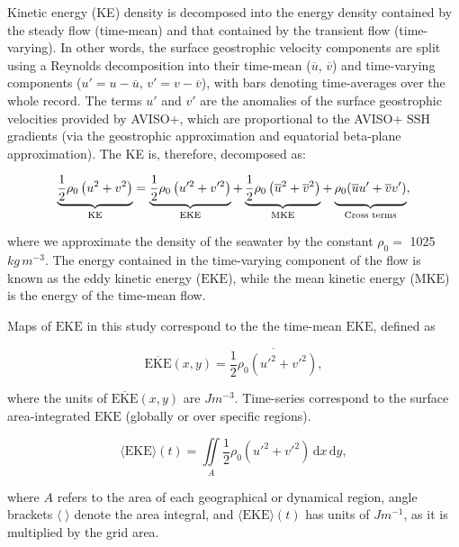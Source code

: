 \documentclass{nature}
\newcommand{\KE}{\text{KE}}
\newcommand{\MKE}{\text{MKE}}
\newcommand{\EKE}{\text{EKE}}
\newcommand{\SSH}{\text{SSH}}
\begin{document}
Kinetic energy (KE) density is decomposed into the energy density contained by the steady flow (time-mean) and that contained by the transient flow (time-varying). In other words, the surface geostrophic velocity components are split using a Reynolds decomposition into their time-mean ($\overline{u}$, $\overline{v}$) and time-varying components ($u'=u-\overline{u}$, $v'=v-\overline{v}$), with bars denoting time-averages over the whole record. The terms $u'$ and $v'$ are the anomalies of the surface geostrophic velocities provided by AVISO+, which are proportional to the AVISO+ $\SSH$ gradients (via the geostrophic approximation and equatorial beta-plane approximation). The KE is, therefore, decomposed as:
\begin{linenomath*}
\begin{equation}
	\underbrace{\frac{1}{2}\rho_0\left(u^2 + v^2\right)}_{\KE}  = \underbrace{\frac{1}{2}\rho_0\left(u'^2 + v'^2\right)}_{\EKE}+\underbrace{\frac{1}{2}\rho_0\left(\overline{u}^2 + \overline{v}^2 \right)}_{\MKE} + \underbrace{\vphantom{\frac1{2}}\rho_0(\overline{u}u'+\overline{v}v')}_{\textrm{Cross terms}},
\end{equation}
\end{linenomath*}

where we approximate the density of the seawater by the constant $\rho_0 = $ 1025 $kg\,m^{-3}$. The energy contained in the time-varying component of the flow is known as the eddy kinetic energy ($\EKE$), while the mean kinetic energy ($\MKE$) is the energy of the time-mean flow.

Maps of $\EKE$ in this study correspond to the the time-mean $\EKE$, defined as
\begin{linenomath*}
\begin{equation}
	\overline{\EKE}(x,y) =  \overline{\frac{1}{2} \rho_0 (u'^2 + v'^2)},
\end{equation}
\end{linenomath*}
where the units of $\overline{\EKE}(x,y)$ are $J m^{-3}$. Time-series correspond to the surface area-integrated $\EKE$ (globally or over specific regions).
\begin{linenomath*} 
\begin{equation}
	\langle\EKE\rangle(t) = \iint\limits_A \frac{1}{2} \rho_0 (u'^2 + v'^2) \, \mathrm{d}x\,\mathrm{d}y,
\end{equation}
\end{linenomath*}
where $A$ refers to the area of each geographical or dynamical region, angle brackets $\langle \; \rangle$ denote the area integral,  and $\langle\EKE\rangle(t)$ has units of $J m^{-1}$, as it is multiplied by the grid area.
\end{document}
